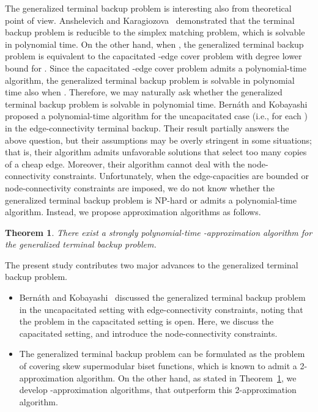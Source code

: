 \documentclass{article}
\newtheorem{theorem}{Theorem}
\begin{document}
The generalized terminal backup problem is interesting also from theoretical point of view.
Anshelevich and Karagiozova~\cite{AnshelevichK11} demonstrated
that the terminal backup problem is reducible to the simplex
matching problem, which is solvable in polynomial time. 
On the other hand, when , the generalized terminal backup problem is equivalent to the capacitated 
-edge cover problem with degree lower
bound  for . Since the capacitated 
-edge cover problem admits a polynomial-time algorithm, the
generalized terminal backup problem is solvable in polynomial time also when . 
Therefore, we may naturally ask whether the generalized terminal backup
problem is solvable in polynomial time. Bern{\'a}th and Kobayashi~\cite{Bernath2014} proposed a
polynomial-time algorithm for the uncapacitated case (i.e.,  for each )
in the edge-connectivity terminal backup. Their result partially
answers the above question, but their assumptions may be overly stringent in some situations;
that is, their algorithm admits unfavorable solutions that select too many copies of a cheap edge. 
Moreover, their algorithm cannot deal with the node-connectivity constraints.
Unfortunately, 
when the edge-capacities are bounded or node-connectivity constraints
are imposed,
we do not know whether
the generalized terminal backup problem is NP-hard or admits a
polynomial-time algorithm.
Instead, we propose approximation algorithms as follows.

\begin{theorem}\label{thm:main-4/3}
There exist a strongly polynomial-time -approximation algorithm for
the generalized terminal backup problem.
\end{theorem}


The present study contributes two major advances
to the generalized terminal backup problem.
\begin{itemize}
	\item Bern{\'a}th and Kobayashi~\cite{Bernath2014} discussed the 
	generalized terminal backup problem 
	in the uncapacitated setting
	with edge-connectivity constraints, noting that 
	the problem in the capacitated setting is open.
	Here, we discuss the capacitated setting, and 
	introduce the node-connectivity constraints.
	\item The generalized
	terminal backup problem can be formulated as the problem of covering skew
	supermodular biset functions, which is known to admit a 2-approximation algorithm.
	On the other hand, as stated in Theorem~\ref{thm:main-4/3}, we develop 
	-approximation algorithms, that outperform this 2-approximation algorithm.
\end{itemize}
\end{document}
